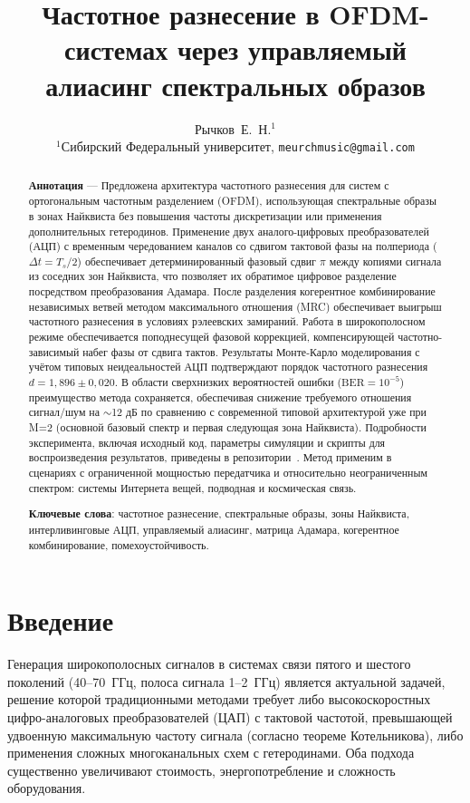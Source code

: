 \documentclass[a4paper,12pt]{article}
\title{\textbf{Частотное разнесение в OFDM-системах через управляемый алиасинг спектральных образов}}
\author{
    Рычков~Е.~Н.$^{1}$ \\
    $^{1}$Сибирский Федеральный университет, \texttt{meurchmusic@gmail.com} \\
}
\date{}
\numberwithin{equation}{section}
\begin{document}
\maketitle

\begin{abstract}
\noindent \textbf{Аннотация} --- Предложена архитектура частотного разнесения для систем с ортогональным частотным разделением (OFDM), использующая спектральные образы в зонах Найквиста без повышения частоты дискретизации или применения дополнительных гетеродинов. Применение двух аналого-цифровых преобразователей (АЦП) с временным чередованием каналов со сдвигом тактовой фазы на полпериода ($\Delta t = T_s/2$) обеспечивает детерминированный фазовый сдвиг $\pi$ между копиями сигнала из соседних зон Найквиста, что позволяет их обратимое цифровое разделение посредством преобразования Адамара. После разделения когерентное комбинирование независимых ветвей методом максимального отношения (MRC) обеспечивает выигрыш частотного разнесения в условиях рэлеевских замираний. Работа в широкополосном режиме обеспечивается поподнесущей фазовой коррекцией, компенсирующей частотно-зависимый набег фазы от сдвига тактов. Результаты Монте-Карло моделирования с учётом типовых неидеальностей АЦП подтверждают порядок частотного разнесения $d = 1{,}896 \pm 0{,}020$. В области сверхнизких вероятностей ошибки ($\text{BER}=10^{-5}$) преимущество метода сохраняется, обеспечивая снижение требуемого отношения сигнал/шум на $\sim$12 дБ по сравнению с современной типовой архитектурой уже при M=2 (основной базовый спектр и первая следующая зона Найквиста). Подробности эксперимента, включая исходный код, параметры симуляции и скрипты для воспроизведения результатов, приведены в репозитории~\cite{github}. Метод применим в сценариях с ограниченной мощностью передатчика и относительно неограниченным спектром: системы Интернета вещей, подводная и космическая связь.

\medskip
\noindent \textbf{Ключевые слова}: частотное разнесение, спектральные образы, зоны Найквиста, интерливинговые АЦП, управляемый алиасинг, матрица Адамара, когерентное комбинирование, помехоустойчивость.
\end{abstract}

\section{Введение}
\label{sec:intro}

Генерация широкополосных сигналов в системах связи пятого и шестого поколений (40--70~ГГц, полоса сигнала 1--2~ГГц) является актуальной задачей, решение которой традиционными методами требует либо высокоскоростных цифро-аналоговых преобразователей (ЦАП) с тактовой частотой, превышающей удвоенную максимальную частоту сигнала (согласно теореме Котельникова), либо применения сложных многоканальных схем с гетеродинами. Оба подхода существенно увеличивают стоимость, энергопотребление и сложность оборудования.
\end{document}
